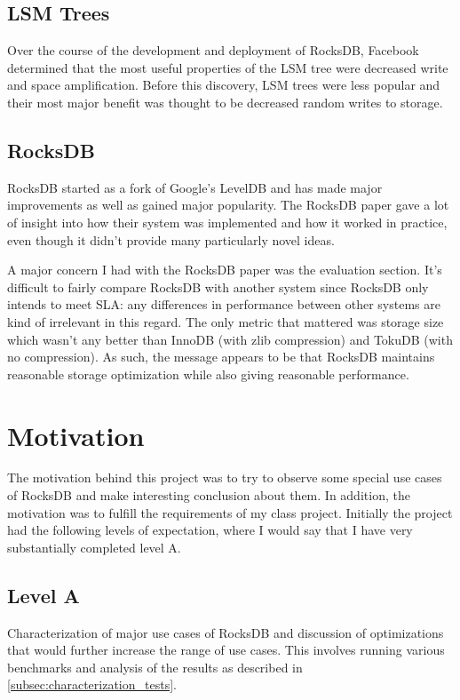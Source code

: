 \documentclass[twocolumn,11pt]{article}
\begin{document}
\subsection{LSM Trees}

Over the course of the development and deployment of RocksDB, Facebook
determined that the most useful properties of the LSM tree were decreased write
and space amplification. Before this discovery, LSM trees were less popular and
their most major benefit was thought to be decreased random writes to storage.

\subsection{RocksDB}

RocksDB\cite{rocksdb} started as a fork of Google's LevelDB\cite{leveldb} and
has made major improvements as well as gained major popularity. The RocksDB
paper gave a lot of insight into how their system was implemented and how it
worked in practice, even though it didn't provide many particularly novel ideas.

A major concern I had with the RocksDB paper was the evaluation section. It's
difficult to fairly compare RocksDB with another system since RocksDB only
intends to meet SLA: any differences in performance between other systems are
kind of irrelevant in this regard. The only metric that mattered was storage
size which wasn't any better than InnoDB (with zlib compression) and TokuDB
(with no compression). As such, the message appears to be that RocksDB maintains
reasonable storage optimization while also giving reasonable performance.

\section{Motivation}

The motivation behind this project was to try to observe some special use cases
of RocksDB and make interesting conclusion about them. In addition, the
motivation was to fulfill the requirements of my class project. Initially the
project had the following levels of expectation, where I would say that I have
very substantially completed level A.

\subsection{Level A}

Characterization of major use cases of RocksDB and discussion of optimizations
that would further increase the range of use cases. This involves running
various benchmarks and analysis of the results as described in
\ref{subsec:characterization_tests}.
\end{document}
